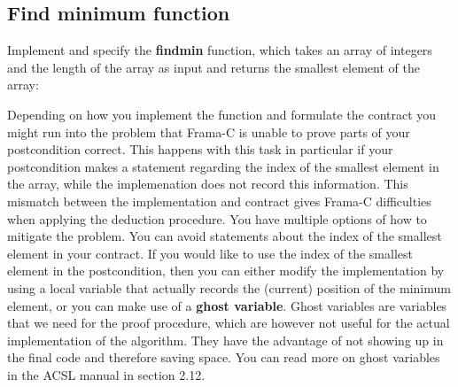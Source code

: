 \subsection{Find minimum function}

Implement and specify the \textbf{find\textunderscore min} function, which takes an array of integers and the length of the array as input and returns the smallest element of the array: 


Depending on how you implement the function and formulate the contract you might run into the problem that Frama-C is unable to prove parts of your postcondition correct. This happens with this task in particular if your postcondition makes a statement regarding the index of the smallest element in the array, while the implemenation does not record this information. This mismatch between the implementation and contract gives Frama-C difficulties when applying the deduction procedure. You have multiple options of how to mitigate the problem. You can avoid statements about the index of the smallest element in your contract. If you would like to use the index of the smallest element in the postcondition, then you can either modify the implementation by using a local variable that actually records the (current) position of the minimum element, or you can make use of a \textbf{ghost variable}. Ghost variables are variables that we need for the proof procedure, which are however not useful for the actual implementation of the algorithm. They have the advantage of not showing up in the final code and therefore saving space. You can read more on ghost variables in the ACSL manual \cite{baudin_acsl_nodate} in section 2.12. 
